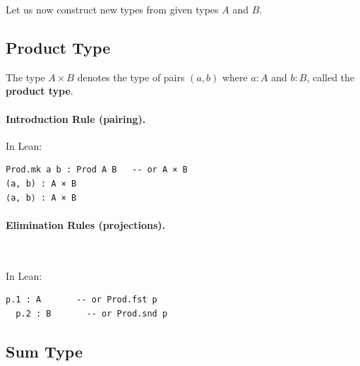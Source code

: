 Let us now construct new types from given types $A$ and $B$.

\subsection*{Product Type}

The type $A \times B$ denotes the type of pairs $(a, b)$ where
$a : A$ and $b : B$, called the \textbf{product type}.

\paragraph{Introduction Rule (pairing).}
\begin{prooftree}
\end{prooftree}

\noindent In Lean:
\begin{lstlisting}[language=lean]
Prod.mk a b : Prod A B   -- or A × B
(a, b) : A × B
⟨a, b⟩ : A × B
\end{lstlisting}

\paragraph{Elimination Rules (projections).}\mbox{}\\[0.5em]
\noindent
\begin{minipage}[t]{0.48\textwidth}
  \vspace{0pt}
  \begin{prooftree}
  \end{prooftree}
\end{minipage}\hfill
\begin{minipage}[t]{0.48\textwidth}
  \vspace{0pt}
  \begin{prooftree}
  \end{prooftree}
\end{minipage}

\noindent In Lean:
\begin{lstlisting}[language=lean]
  p.1 : A       -- or Prod.fst p
  p.2 : B       -- or Prod.snd p
\end{lstlisting}

\subsection*{Sum Type}

